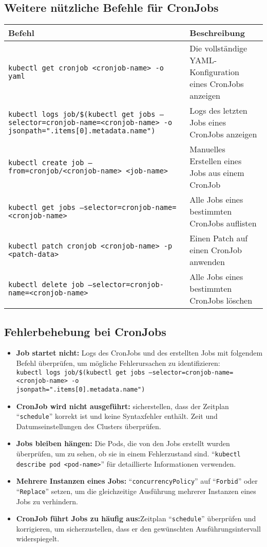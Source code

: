 \subsection{Weitere nützliche Befehle für CronJobs}
\begin{tabular}{|p{}|p{}|}
\hline
\textbf{Befehl} & \textbf{Beschreibung} \\
\hline
\texttt{kubectl get cronjob <cronjob-name> -o yaml} & Die vollständige YAML-Konfiguration eines CronJobs anzeigen \\
\texttt{kubectl logs job/\$(kubectl get jobs --selector=cronjob-name=<cronjob-name> -o jsonpath="{.items[0].metadata.name}")} & Logs des letzten Jobs eines CronJobs anzeigen \\
\texttt{kubectl create job --from=cronjob/<cronjob-name> <job-name>} & Manuelles Erstellen eines Jobs aus einem CronJob \\
\texttt{kubectl get jobs --selector=cronjob-name=<cronjob-name>} & Alle Jobs eines bestimmten CronJobs auflisten \\
\texttt{kubectl patch cronjob <cronjob-name> -p <patch-data>} & Einen Patch auf einen CronJob anwenden \\
\texttt{kubectl delete job --selector=cronjob-name=<cronjob-name>} & Alle Jobs eines bestimmten CronJobs löschen \\
\hline
\end{tabular}

\subsection{Fehlerbehebung bei CronJobs}
\begin{itemize}
    \item \textbf{Job startet nicht:} Logs des CronJobs und des erstellten Jobs mit folgendem Befehl überprüfen, um mögliche Fehlerursachen zu identifizieren:\\
    \texttt{kubectl logs job/\$(kubectl get jobs --selector=cronjob-name=<cronjob-name> -o\\jsonpath="{.items[0].metadata.name}")}
    \item \textbf{CronJob wird nicht ausgeführt:} sicherstellen, dass der Zeitplan \enquote{\texttt{schedule}} korrekt ist und keine Syntaxfehler enthält. Zeit und Datumseinstellungen des Clusters überprüfen.
    \item \textbf{Jobs bleiben hängen:} Die Pods, die von den Jobs erstellt wurden überprüfen, um zu sehen, ob sie in einem Fehlerzustand sind. \enquote{\texttt{kubectl describe pod <pod-name>}} für detaillierte Informationen verwenden.
    \item \textbf{Mehrere Instanzen eines Jobs:} \enquote{\texttt{concurrencyPolicy}} auf \enquote{\texttt{Forbid}} oder \enquote{\texttt{Replace}} setzen, um die gleichzeitige Ausführung mehrerer Instanzen eines Jobs zu verhindern.
    \item \textbf{CronJob führt Jobs zu häufig aus:}Zeitplan \enquote{\texttt{schedule}} überprüfen und korrigieren, um sicherzustellen, dass er den gewünschten Ausführungsintervall widerspiegelt.
\end{itemize}
\newpage
